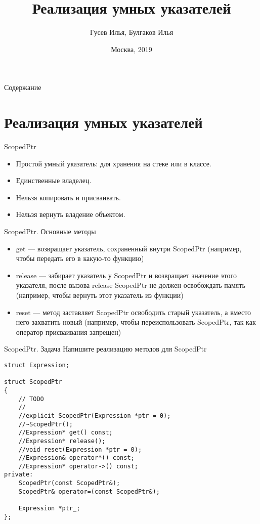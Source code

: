 \documentclass[10pt]{beamer}
\title[\href{https://goo.gl/NRgp8K}{https://goo.gl/NRgp8K} (Term 1)]{Реализация умных указателей}
\author[Гусев Илья, Булгаков Илья]{Гусев Илья, Булгаков Илья}
\institute[МФТИ] 
{Московский физико-технический институт\\*}
\date{Москва, 2019}
\begin{document}
\begin{frame}
  \titlepage
\end{frame}

\begin{frame}{Содержание}
\tableofcontents
\end{frame}

\section{Реализация умных указателей}

\begin{frame}[fragile]{ScopedPtr}

\begin{itemize}
    \item Простой умный указатель: для хранения на стеке или в классе.
    \item Единственные владелец.
    \item Нельзя копировать и присваивать.
    \item Нельзя вернуть владение объектом.
\end{itemize}

\end{frame}

\begin{frame}[fragile]{ScopedPtr. Основные методы}

\begin{itemize}
    \item get — возвращает указатель, сохраненный внутри ScopedPtr (например, чтобы передать его в какую-то функцию)
    \item release — забирает указатель у ScopedPtr и возвращает значение этого указателя, после вызова release ScopedPtr не должен освобождать память (например, чтобы вернуть этот указатель из функции)
    \item reset — метод заставляет ScopedPtr освободить старый указатель, а вместо него захватить новый (например, чтобы переиспользовать ScopedPtr, так как оператор присваивания запрещен)
\end{itemize}

\end{frame}

\begin{frame}[fragile]{ScopedPtr. Задача}
Напишите реализацию методов для ScopedPtr
\begin{lstlisting}
struct Expression;

struct ScopedPtr
{
    // TODO
    //
    //explicit ScopedPtr(Expression *ptr = 0);
    //~ScopedPtr();
    //Expression* get() const;
    //Expression* release();
    //void reset(Expression *ptr = 0);
    //Expression& operator*() const;
    //Expression* operator->() const;
private:
    ScopedPtr(const ScopedPtr&);
    ScopedPtr& operator=(const ScopedPtr&);

    Expression *ptr_;
};
\end{lstlisting}
\end{frame}
\end{document}
